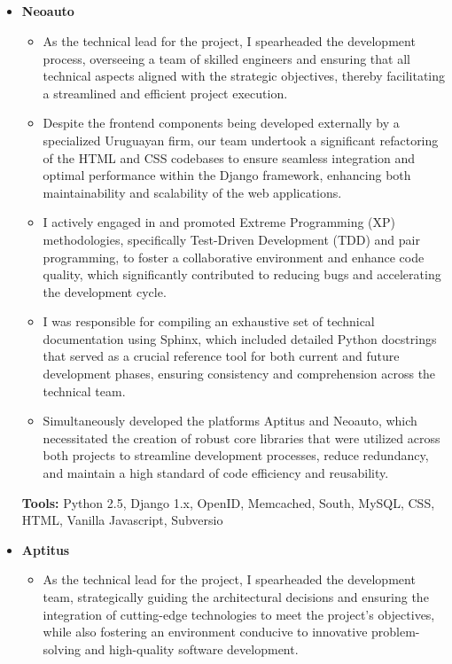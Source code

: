 \documentclass[11pt,a4paper,english]{moderncv}
\begin{document}
\subsection{}

{
\begin{itemize}
    \item \textbf{Neoauto}
        \begin{itemize}
            \item As the technical lead for the project, I spearheaded the development process, overseeing a team of skilled engineers and ensuring that all technical aspects aligned with the strategic objectives, thereby facilitating a streamlined and efficient project execution.
            \item Despite the frontend components being developed externally by a specialized Uruguayan firm, our team undertook a significant refactoring of the HTML and CSS codebases to ensure seamless integration and optimal performance within the Django framework, enhancing both maintainability and scalability of the web applications.
            \item I actively engaged in and promoted Extreme Programming (XP) methodologies, specifically Test-Driven Development (TDD) and pair programming, to foster a collaborative environment and enhance code quality, which significantly contributed to reducing bugs and accelerating the development cycle.
            \item I was responsible for compiling an exhaustive set of technical documentation using Sphinx, which included detailed Python docstrings that served as a crucial reference tool for both current and future development phases, ensuring consistency and comprehension across the technical team.
            \item Simultaneously developed the platforms Aptitus and Neoauto, which necessitated the creation of robust core libraries that were utilized across both projects to streamline development processes, reduce redundancy, and maintain a high standard of code efficiency and reusability.
        \end{itemize}
        \textbf{Tools:} Python 2.5, Django 1.x, OpenID, Memcached, South, MySQL, CSS, HTML, Vanilla Javascript, Subversio
    \item \textbf{Aptitus}
        \begin{itemize}
            \item As the technical lead for the project, I spearheaded the development team, strategically guiding the architectural decisions and ensuring the integration of cutting-edge technologies to meet the project's objectives, while also fostering an environment conducive to innovative problem-solving and high-quality software development.

\end{itemize}
\end{itemize}}
\end{document}
